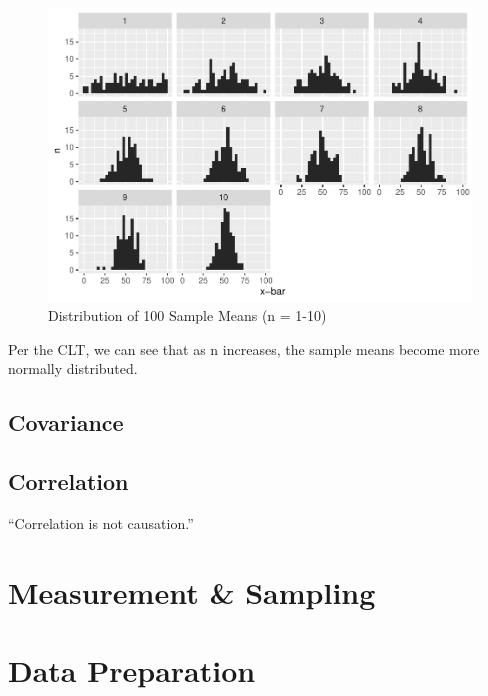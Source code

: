 \documentclass[]{book}
\begin{document}
\begin{figure}

{\centering \includegraphics{_main_files/figure-latex/unnamed-chunk-6-1} 

}

\caption{Distribution of 100 Sample Means (n = 1-10)}\label{fig:unnamed-chunk-6}
\end{figure}

Per the CLT, we can see that as n increases, the sample means become more normally distributed.

\hypertarget{covariance}{%
\section{Covariance}\label{covariance}}

\hypertarget{correlation}{%
\section{Correlation}\label{correlation}}

``Correlation is not causation.''

\hypertarget{measurement-sampling}{%
\chapter{Measurement \& Sampling}\label{measurement-sampling}}

\hypertarget{data-preparation}{%
\chapter{Data Preparation}\label{data-preparation}}
\end{document}
